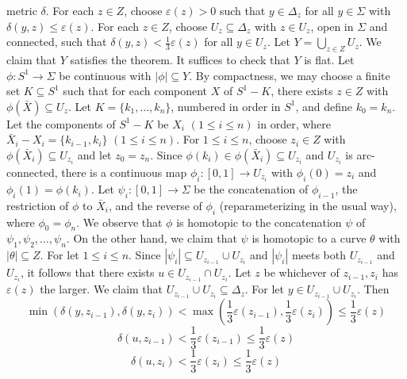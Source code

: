 \noindent metric $\delta$. For each $z \in Z$, choose $\varepsilon(z) > 0$ such that $y \in \Delta_z$ for all $y \in \Sigma$ with $\delta(y, z) \le \varepsilon(z)$. For each $z \in Z$, choose $U_z \subseteq \Delta_z$ with $z \in U_z$, open in $\Sigma$ and connected, such that $\delta(y, z) < \frac{1}{3}\varepsilon(z)$ for all $y \in U_z$. Let $Y = \bigcup_{z \in Z} U_z$. We claim that $Y$ satisfies the theorem. It suffices to check that $Y$ is flat. Let $\phi \colon S^1 \to \Sigma$ be continuous with $|\phi| \subseteq Y$. By compactness, we may choose a finite set $K \subseteq S^1$ such that for each component $X$ of $S^1 - K$, there exists $z \in Z$ with $\phi(\bar{X}) \subseteq U_z$. Let $K = \{k_1, \dots, k_n\}$, numbered in order in $S^1$, and define $k_0 = k_n$. Let the components of $S^1 - K$ be $X_i$ $(1 \le i \le n)$ in order, where $\bar{X}_i - X_i = \{k_{i-1}, k_i\}$ $(1 \le i \le n)$. For $1 \le i \le n$, choose $z_i \in Z$ with $\phi(\bar{X}_i) \subseteq U_{z_i}$ and let $z_0 = z_n$. Since $\phi(k_i) \in \phi(\bar{X}_i) \subseteq U_{z_i}$ and $U_{z_i}$ is arc-connected, there is a continuous map $\phi_i \colon [0, 1] \to U_{z_i}$ with $\phi_i(0) = z_i$ and $\phi_i(1) = \phi(k_i)$. Let $\psi_i \colon [0, 1] \to \Sigma$ be the concatenation of $\phi_{i-1}$, the restriction of $\phi$ to $\bar{X}_i$, and the reverse of $\phi_i$ (reparameterizing in the usual way), where $\phi_0 = \phi_n$. We observe that $\phi$ is homotopic to the concatenation $\psi$ of $\psi_1, \psi_2, \dots, \psi_n$. On the other hand, we claim that $\psi$ is homotopic to a curve $\theta$ with $|\theta| \subseteq Z$. For let $1 \le i \le n$. Since $|\psi_i| \subseteq U_{z_{i-1}} \cup U_{z_i}$ and $|\psi_i|$ meets both $U_{z_{i-1}}$ and $U_{z_i}$, it follows that there exists $u \in U_{z_{i-1}} \cap U_{z_i}$. Let $z$ be whichever of $z_{i-1}, z_i$ has $\varepsilon(z)$ the larger. We claim that $U_{z_{i-1}} \cup U_{z_i} \subseteq \Delta_z$. For let $y \in U_{z_{i-1}} \cup U_{z_i}$. Then
\begin{equation*}
\min(\delta(y, z_{i-1}), \delta(y, z_i)) < \max(\frac{1}{3}\varepsilon(z_{i-1}), \frac{1}{3}\varepsilon(z_i)) \le \frac{1}{3}\varepsilon(z)
\end{equation*}
\begin{equation*}
\delta(u, z_{i-1}) < \frac{1}{3}\varepsilon(z_{i-1}) \le \frac{1}{3}\varepsilon(z)
\end{equation*}
\begin{equation*}
\delta(u, z_i) < \frac{1}{3}\varepsilon(z_i) \le \frac{1}{3}\varepsilon(z)
\end{equation*}
